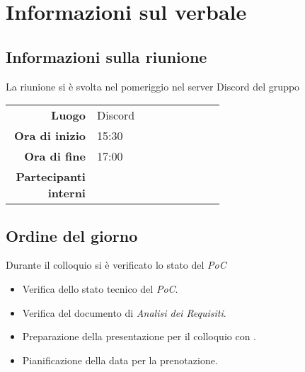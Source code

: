 \section{Informazioni sul verbale}

\subsection{Informazioni sulla riunione}
La riunione si è svolta nel pomeriggio nel server Discord del gruppo

\begin{center}
	\begin{tabular}{r|p{0.6\linewidth}}
		\toprule
		\textbf{Luogo} & Discord \\
		\textbf{Ora di inizio} & 15:30 \\
		\textbf{Ora di fine} & 17:00 \\
		\textbf{Partecipanti interni} & \groupTeam
	\end{tabular}
\end{center}

\medskip

\subsection{Ordine del giorno}
Durante il colloquio si è verificato lo stato del \textit{PoC}
\begin{itemize}
	\item Verifica dello stato tecnico del \textit{PoC}.
	\item Verifica del documento di \textit{Analisi dei Requisiti}.
	\item Preparazione della presentazione per il colloquio con \Cardin.
	\item Pianificazione della data per la prenotazione.
\end{itemize}